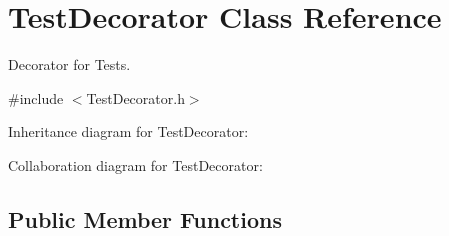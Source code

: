 \hypertarget{class_test_decorator}{\section{Test\+Decorator Class Reference}
\label{class_test_decorator}
}


Decorator for Tests.  




{\ttfamily \#include $<$Test\+Decorator.\+h$>$}



Inheritance diagram for Test\+Decorator\+:


Collaboration diagram for Test\+Decorator\+:
\subsection*{Public Member Functions}
